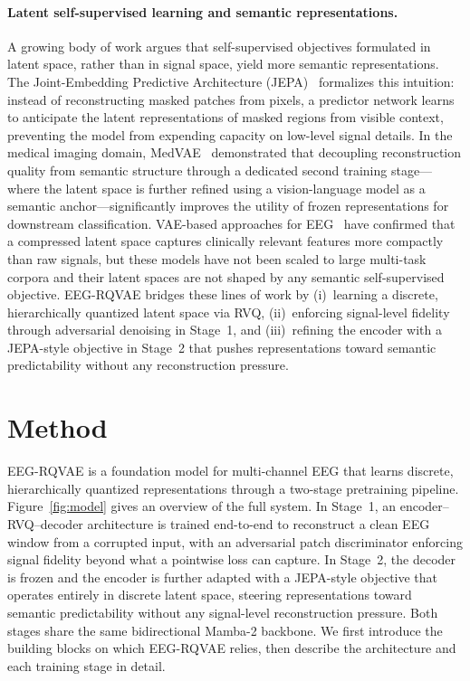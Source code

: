 \documentclass{article}
\begin{document}
\paragraph{Latent self-supervised learning and semantic representations.}
A growing body of work argues that self-supervised objectives formulated in latent space, rather than in signal space, yield more semantic representations.
The Joint-Embedding Predictive Architecture (JEPA)~\citep{assran2023selfsupervisedlearningimagesjointembedding} formalizes this intuition: instead of reconstructing masked patches from pixels, a predictor network learns to anticipate the latent representations of masked regions from visible context, preventing the model from expending capacity on low-level signal details.
In the medical imaging domain, MedVAE~\citep{varma2025medvaeefficientautomatedinterpretation} demonstrated that decoupling reconstruction quality from semantic structure through a dedicated second training stage---where the latent space is further refined using a vision-language model as a semantic anchor---significantly improves the utility of frozen representations for downstream classification.
VAE-based approaches for EEG~\citep{ZHAO2024120946, s25103178} have confirmed that a compressed latent space captures clinically relevant features more compactly than raw signals, but these models have not been scaled to large multi-task corpora and their latent spaces are not shaped by any semantic self-supervised objective.
EEG-RQVAE bridges these lines of work by (i)~learning a discrete, hierarchically quantized latent space via RVQ, (ii)~enforcing signal-level fidelity through adversarial denoising in Stage~1, and (iii)~refining the encoder with a JEPA-style objective in Stage~2 that pushes representations toward semantic predictability without any reconstruction pressure.


\section{Method}

EEG-RQVAE is a foundation model for multi-channel EEG that learns discrete, hierarchically quantized representations through a two-stage pretraining pipeline.
Figure~\ref{fig:model} gives an overview of the full system.
In Stage~1, an encoder--RVQ--decoder architecture is trained end-to-end to reconstruct a clean EEG window from a corrupted input, with an adversarial patch discriminator enforcing signal fidelity beyond what a pointwise loss can capture.
In Stage~2, the decoder is frozen and the encoder is further adapted with a JEPA-style objective that operates entirely in discrete latent space, steering representations toward semantic predictability without any signal-level reconstruction pressure.
Both stages share the same bidirectional Mamba-2 backbone.
We first introduce the building blocks on which EEG-RQVAE relies, then describe the architecture and each training stage in detail.
\end{document}
